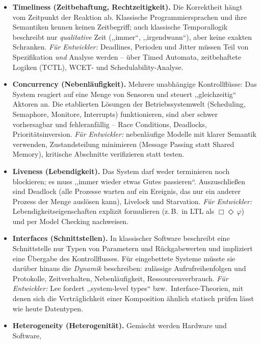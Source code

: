 \begin{loesung}
\begin{itemize}
    \item \textbf{Timeliness (Zeitbehaftung, Rechtzeitigkeit).} Die Korrektheit hängt vom Zeitpunkt
          der Reaktion ab. Klassische Programmiersprachen und ihre Semantiken kennen keinen
          Zeitbegriff; auch klassische Temporallogik beschreibt nur \emph{qualitative} Zeit
          (,,immer``, ,,irgendwann``), aber keine exakten Schranken. \emph{Für Entwickler:}
          Deadlines, Perioden und Jitter müssen Teil von Spezifikation \emph{und} Analyse werden
          -- über Timed Automata, zeitbehaftete Logiken (TCTL), WCET- und Schedulability-Analyse.
    \item \textbf{Concurrency (Nebenläufigkeit).} Mehrere unabhängige Kontrollflüsse: Das System
          reagiert auf eine Menge von Sensoren und steuert ,,gleichzeitig`` Aktoren an. Die
          etablierten Lösungen der Betriebssystemwelt (Scheduling, Semaphore, Monitore, Interrupts)
          funktionieren, sind aber schwer vorhersagbar und fehleranfällig -- Race Conditions,
          Deadlocks, Prioritätsinversion. \emph{Für Entwickler:} nebenläufige Modelle mit klarer
          Semantik verwenden, Zustandsteilung minimieren (Message Passing statt Shared Memory),
          kritische Abschnitte verifizieren statt testen.
    \item \textbf{Liveness (Lebendigkeit).} Das System darf weder terminieren noch blockieren; es
          muss ,,immer wieder etwas Gutes passieren``. Auszuschließen sind Deadlock (alle Prozesse
          warten auf ein Ereignis, das nur ein anderer Prozess der Menge auslösen kann), Livelock
          und Starvation. \emph{Für Entwickler:} Lebendigkeitseigenschaften explizit formulieren
          (z.\,B.\ in LTL als $\Box\Diamond\,\varphi$) und per Model Checking nachweisen.
    \item \textbf{Interfaces (Schnittstellen).} In klassischer Software beschreibt eine Schnittstelle
          nur Typen von Parametern und Rückgabewerten und impliziert eine Übergabe des Kontrollflusses.
          Für eingebettete Systeme müsste sie darüber hinaus die \emph{Dynamik} beschreiben:
          zulässige Aufrufreihenfolgen und Protokolle, Zeitverhalten, Nebenläufigkeit,
          Ressourcenverbrauch. \emph{Für Entwickler:} Lee fordert ,,system-level types`` bzw.\
          Interface-Theorien, mit denen sich die Verträglichkeit einer Komposition ähnlich statisch
          prüfen lässt wie heute Datentypen.
    \item \textbf{Heterogeneity (Heterogenität).} Gemischt werden Hardware und Software,

\end{itemize}
\end{loesung}
